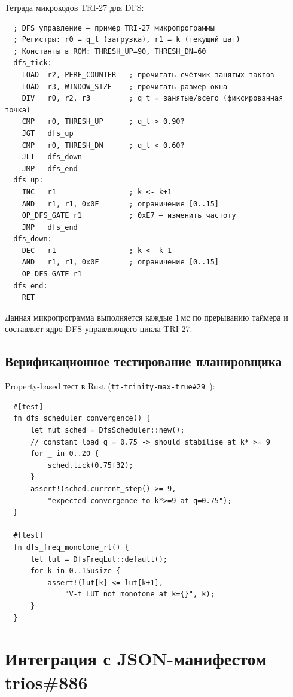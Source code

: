 Тетрада микрокодов TRI-27 для DFS:
\begin{verbatim}
  ; DFS управление — пример TRI-27 микропрограммы
  ; Регистры: r0 = q_t (загрузка), r1 = k (текущий шаг)
  ; Константы в ROM: THRESH_UP=90, THRESH_DN=60
  dfs_tick:
    LOAD  r2, PERF_COUNTER   ; прочитать счётчик занятых тактов
    LOAD  r3, WINDOW_SIZE    ; прочитать размер окна
    DIV   r0, r2, r3         ; q_t = занятые/всего (фиксированная точка)
    CMP   r0, THRESH_UP      ; q_t > 0.90?
    JGT   dfs_up
    CMP   r0, THRESH_DN      ; q_t < 0.60?
    JLT   dfs_down
    JMP   dfs_end
  dfs_up:
    INC   r1                 ; k <- k+1
    AND   r1, r1, 0x0F       ; ограничение [0..15]
    OP_DFS_GATE r1           ; 0xE7 — изменить частоту
    JMP   dfs_end
  dfs_down:
    DEC   r1                 ; k <- k-1
    AND   r1, r1, 0x0F       ; ограничение [0..15]
    OP_DFS_GATE r1
  dfs_end:
    RET
\end{verbatim}

Данная микропрограмма выполняется каждые $1\,\text{мс}$ по прерыванию
таймера и составляет ядро DFS-управляющего цикла TRI-27.

\subsection{Верификационное тестирование планировщика}
\label{subsec:scheduler-testing}

Property-based тест в Rust (\texttt{tt-trinity-max-true\#29}~\cite{tt-trinity-max-true29}):
\begin{verbatim}
  #[test]
  fn dfs_scheduler_convergence() {
      let mut sched = DfsScheduler::new();
      // constant load q = 0.75 -> should stabilise at k* >= 9
      for _ in 0..20 {
          sched.tick(0.75f32);
      }
      assert!(sched.current_step() >= 9,
          "expected convergence to k*>=9 at q=0.75");
  }

  #[test]
  fn dfs_freq_monotone_rt() {
      let lut = DfsFreqLut::default();
      for k in 0..15usize {
          assert!(lut[k] <= lut[k+1],
              "V-f LUT not monotone at k={}", k);
      }
  }
\end{verbatim}

\section{Интеграция с JSON-манифестом trios\#886}
\label{sec:glava86-json-manifest}

